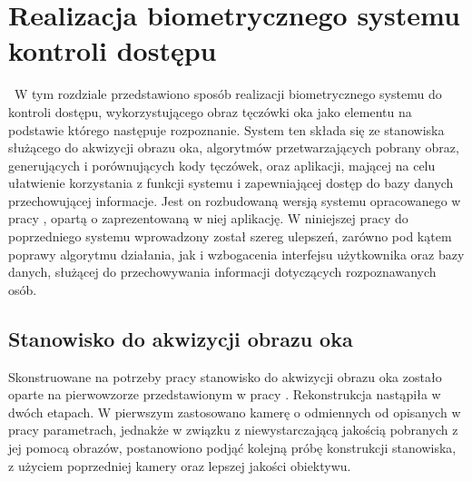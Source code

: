 \chapter{Realizacja biometrycznego systemu kontroli dostępu}
\label{cha:realizacja}
~W tym rozdziale przedstawiono sposób realizacji biometrycznego systemu do kontroli dostępu, wykorzystującego obraz tęczówki oka jako elementu na podstawie którego następuje rozpoznanie. System ten składa się ze stanowiska służącego do akwizycji obrazu oka, algorytmów przetwarzających pobrany obraz, generujących i porównujących kody tęczówek, oraz aplikacji, mającej na celu ułatwienie korzystania z funkcji systemu i zapewniającej dostęp do bazy danych przechowującej informacje. Jest on rozbudowaną wersją systemu opracowanego w pracy \cite{Gl11}, opartą o zaprezentowaną w niej aplikację. W niniejszej pracy do poprzedniego systemu wprowadzony został szereg ulepszeń, zarówno pod kątem poprawy algorytmu działania, jak i wzbogacenia interfejsu użytkownika oraz bazy danych, służącej do przechowywania informacji dotyczących rozpoznawanych osób.

\section{Stanowisko do akwizycji obrazu oka}
\label{sec:stanowisko}
Skonstruowane na potrzeby pracy stanowisko do akwizycji obrazu oka zostało oparte na pierwowzorze przedstawionym w pracy \cite{Gl11}. Rekonstrukcja nastąpiła w dwóch etapach. W pierwszym zastosowano kamerę o odmiennych od opisanych w pracy \cite{Gl11} parametrach, jednakże w związku z niewystarczającą jakością pobranych z jej pomocą obrazów, postanowiono podjąć kolejną próbę konstrukcji stanowiska, z użyciem poprzedniej kamery oraz lepszej jakości obiektywu.


